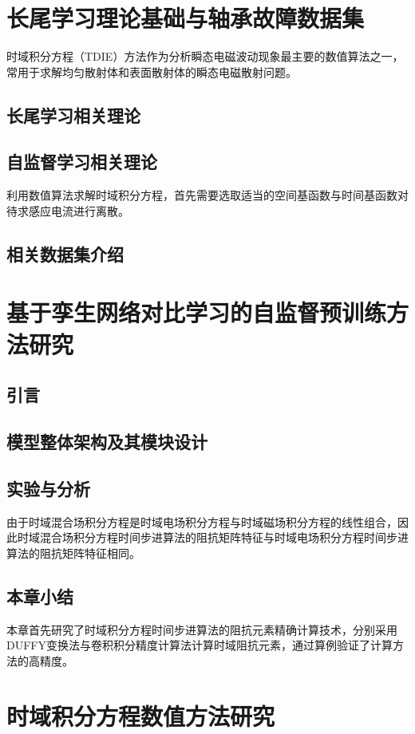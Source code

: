 \documentclass[master]{thesis-uestc}
\begin{document}
\chapter{长尾学习理论基础与轴承故障数据集}
时域积分方程（TDIE）方法作为分析瞬态电磁波动现象最主要的数值算法之一，常用于求解均匀散射体和表面散射体的瞬态电磁散射问题。

\section{长尾学习相关理论}

\section{自监督学习相关理论}
利用数值算法求解时域积分方程，首先需要选取适当的空间基函数与时间基函数对待求感应电流进行离散。

\section{相关数据集介绍}

\chapter{基于孪生网络对比学习的自监督预训练方法研究}
\section{引言}
\section{模型整体架构及其模块设计}
\section{实验与分析}
由于时域混合场积分方程是时域电场积分方程与时域磁场积分方程的线性组合，因此时域混合场积分方程时间步进算法的阻抗矩阵特征与时域电场积分方程时间步进算法的阻抗矩阵特征相同。
\section{本章小结}
本章首先研究了时域积分方程时间步进算法的阻抗元素精确计算技术，分别采用DUFFY变换法与卷积积分精度计算法计算时域阻抗元素，通过算例验证了计算方法的高精度。

\chapter{时域积分方程数值方法研究}
\end{document}
